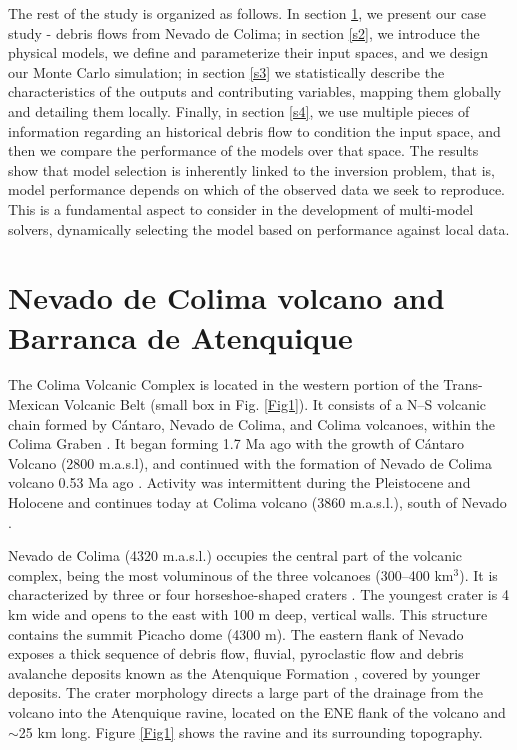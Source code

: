 \documentclass[nhess, manuscript]{copernicus}
\begin{document}
The rest of the study is organized as follows. In section \ref{s1}, we present our case study - debris flows from Nevado de Colima; in section \ref{s2}, we introduce the physical models, we define and parameterize their input spaces, and we design our Monte Carlo simulation; in section \ref{s3} we statistically describe the characteristics of the outputs and contributing variables, mapping them globally and detailing them locally.  Finally, in section \ref{s4}, we use multiple pieces of information regarding an historical debris flow to condition the input space, and then we compare the performance of the models over that space. The results show that model selection is inherently linked to the inversion problem, that is, model performance depends on which of the observed data we seek to reproduce. This is a fundamental aspect to consider in the development of multi-model solvers, dynamically selecting the model based on performance against local data.


\section{Nevado de Colima volcano and Barranca de Atenquique}\label{s1}
The Colima Volcanic Complex is located in the western portion of the Trans-Mexican Volcanic Belt (small box in Fig. \ref{Fig1}). It consists of a N--S volcanic chain formed by C\'antaro, Nevado de Colima, and Colima volcanoes, within the Colima Graben \citep{Luhr1990}. It began forming 1.7 Ma ago with the growth of C\'antaro Volcano (2800 m.a.s.l), and continued with the formation of Nevado de Colima volcano 0.53 Ma ago \citep{Allan1986, Robin1987}. Activity was intermittent during the Pleistocene and Holocene and continues today at Colima volcano (3860 m.a.s.l.), south of  Nevado  \citep{Saucedo2010, Zobin2015, Macorps2018}.

Nevado de Colima (4320 m.a.s.l.) occupies the central part of the volcanic complex, being the most voluminous of the three volcanoes (300--400 km$^3$). It is characterized by three or four horseshoe-shaped craters \citep{Cortes2010}. The youngest crater is 4 km wide and opens to the east with 100 m deep, vertical walls. This structure contains the summit Picacho dome (4300 m). The eastern flank of Nevado exposes a thick sequence of debris flow, fluvial, pyroclastic flow and debris avalanche deposits known as the Atenquique Formation \citep{Mooser1961, Cortes2005, Saucedo2008}, covered by younger deposits. The crater morphology directs a large part of the drainage from the volcano into the Atenquique ravine, located on the ENE flank of the volcano and $\sim$25 km long. Figure \ref{Fig1} shows the ravine and its surrounding topography.
\end{document}
